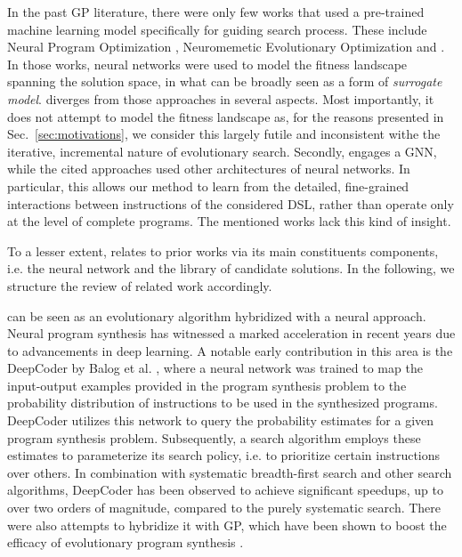 In the past GP literature, there were only few works that used a pre-trained machine learning model specifically for guiding search process. These include Neural Program Optimization \cite{Liskowski:2020:GECCO}, Neuromemetic Evolutionary Optimization \cite{10.1007/978-3-030-58112-1_43} and \cite{10.1145/3638530.3654277}. In those works, neural networks were used to model the fitness landscape spanning the solution space, in what can be broadly seen as a form of \emph{surrogate model}. \mname diverges from those approaches in several aspects. Most importantly, it does not attempt to model the fitness landscape as, for the reasons presented in Sec.\ \ref{sec:motivations}, we consider this largely futile and inconsistent withe the iterative, incremental nature of  evolutionary search. Secondly, \mname engages a GNN, while the cited approaches used other architectures of neural networks. In particular, this allows our method to learn from the detailed, fine-grained interactions between instructions of the considered DSL, rather than operate only at the level of complete programs. The mentioned works lack this kind of insight. 

To a lesser extent, \mname relates to prior works via its main constituents components, i.e. the neural network and the library of candidate solutions. In the following, we structure the review of related work accordingly.   

\mname can be seen as an evolutionary algorithm hybridized with a neural approach. Neural program synthesis has witnessed a marked acceleration in recent years due to advancements in deep learning. A notable early contribution in this area is the DeepCoder by Balog et al. \cite{2016arXiv161101989B}, where a neural network was trained to map the input-output examples provided in the program synthesis problem to the probability distribution of instructions to be used in the synthesized programs. DeepCoder utilizes this network to query the probability estimates for a given program synthesis problem. Subsequently, a search algorithm employs these estimates to parameterize its search policy, i.e. to prioritize certain instructions over others. In combination with systematic breadth-first search and other search algorithms, DeepCoder has been observed to achieve significant speedups, up to over two orders of magnitude, compared to the purely systematic search. There were also attempts to hybridize it with GP, which have been shown to boost the efficacy of evolutionary program synthesis \cite{Liskowski:2018:GECCOa}. 



